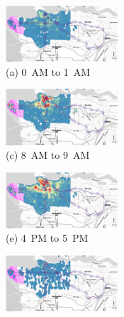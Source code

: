 \begin{figure}[hhh!!]
\centering
   \begin{minipage}[b]{0.3\linewidth}
   \centering      
         \begin{minipage}[b]{\linewidth}
           \hspace*{-0.9cm}
           \centering
           \includegraphics[width=42mm]{car2go_heatmaps/min/0.pdf}
           {\\(a) 0~AM to 1~AM}
         \end{minipage}
         \begin{minipage}[b]{\linewidth}
           \centering
           \hspace*{-0.9cm}
           \includegraphics[width=42mm]{car2go_heatmaps/min/8.pdf}
           {\\(c) 8~AM to 9~AM}
         \end{minipage}
         \begin{minipage}[b]{\linewidth}
           \centering
           \hspace*{-0.9cm}
           \includegraphics[width=42mm]{car2go_heatmaps/min/16.pdf}
           {\\(e) 4~PM to 5~PM}
         \end{minipage}
   \end{minipage}
   \hspace{3mm}
   \begin{minipage}[b]{0.3\linewidth}
   \centering
         \begin{minipage}[b]{\linewidth}
           \centering
           \hspace*{-0.1cm}
           \includegraphics[width=42mm]{car2go_heatmaps/min/4.pdf}

\end{minipage}
\end{minipage}
\end{figure}
